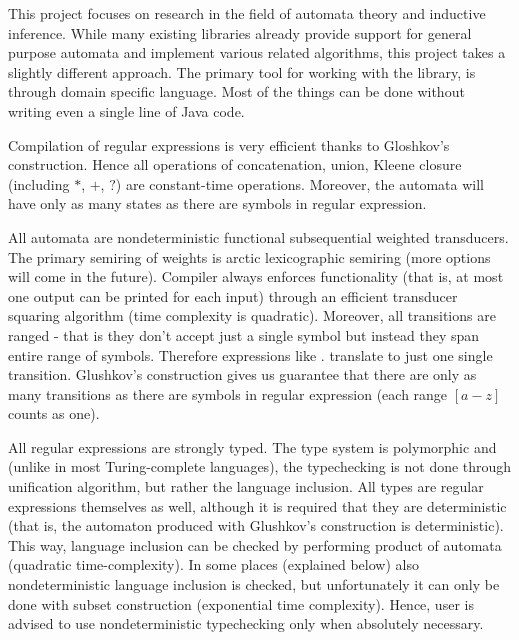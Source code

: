 
This project focuses on research in the field of automata theory and inductive inference. While many existing libraries already provide support for general purpose automata and implement various related algorithms, this project takes a slightly different approach. The primary tool for working with the library, is through domain specific language. Most of the things can be done without writing even a single line of Java code.

Compilation of regular expressions is very efficient thanks to Gloshkov's construction. Hence all operations of concatenation, union, Kleene closure (including $*$, $+$, $?$) are constant-time operations. Moreover, the automata will have only as many states as there are symbols in regular expression.

All automata are nondeterministic functional subsequential weighted transducers. The primary semiring of weights is arctic lexicographic semiring (more options will come in the future). Compiler always enforces functionality (that is, at most one output can be printed for each input) through an efficient transducer squaring algorithm (time complexity is quadratic). Moreover, all transitions are ranged - that is they don't accept just a single symbol but instead they span entire range of symbols. Therefore expressions like $.$ translate to just one single transition. Glushkov's construction gives us guarantee that there are only as many transitions as there are symbols in regular expression (each range $[a-z]$ counts as one).

All regular expressions are strongly typed. The type system is polymorphic and (unlike in most Turing-complete languages), the typechecking is not done through unification algorithm, but rather the language inclusion. All types are regular expressions themselves as well, although it is required that they are deterministic (that is, the automaton produced with Glushkov's construction is deterministic). This way, language inclusion can be checked by performing product of automata (quadratic time-complexity). In some places (explained below) also nondeterministic language inclusion is checked, but unfortunately it can only be done with subset construction (exponential time complexity). Hence, user is advised to use nondeterministic typechecking only when absolutely necessary.

